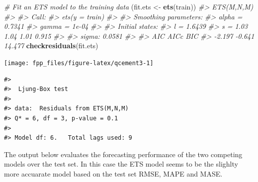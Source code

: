 \documentclass[]{book}
\newenvironment{Shaded}{\begin{snugshade}}{\end{snugshade}}
\newcommand{\CommentTok}[1]{\textcolor[rgb]{0.56,0.35,0.01}{\textit{#1}}}
\newcommand{\DataTypeTok}[1]{\textcolor[rgb]{0.13,0.29,0.53}{#1}}
\newcommand{\DecValTok}[1]{\textcolor[rgb]{0.00,0.00,0.81}{#1}}
\newcommand{\KeywordTok}[1]{\textcolor[rgb]{0.13,0.29,0.53}{\textbf{#1}}}
\newcommand{\NormalTok}[1]{#1}
\newcommand{\OperatorTok}[1]{\textcolor[rgb]{0.81,0.36,0.00}{\textbf{#1}}}
\newcommand{\StringTok}[1]{\textcolor[rgb]{0.31,0.60,0.02}{#1}}
\begin{document}
\begin{Shaded}
\begin{Highlighting}[]
\CommentTok{# Fit an ETS model to the training data}
\NormalTok{(fit.ets <-}\StringTok{ }\KeywordTok{ets}\NormalTok{(train))}
\CommentTok{#> ETS(M,N,M) }
\CommentTok{#> }
\CommentTok{#> Call:}
\CommentTok{#>  ets(y = train) }
\CommentTok{#> }
\CommentTok{#>   Smoothing parameters:}
\CommentTok{#>     alpha = 0.7341 }
\CommentTok{#>     gamma = 1e-04 }
\CommentTok{#> }
\CommentTok{#>   Initial states:}
\CommentTok{#>     l = 1.6439 }
\CommentTok{#>     s = 1.03 1.04 1.01 0.915}
\CommentTok{#> }
\CommentTok{#>   sigma:  0.0581}
\CommentTok{#> }
\CommentTok{#>    AIC   AICc    BIC }
\CommentTok{#> -2.197 -0.641 14.477}
\KeywordTok{checkresiduals}\NormalTok{(fit.ets)}
\end{Highlighting}
\end{Shaded}

\begin{center}\texttt{[image: fpp\_files/figure-latex/qcement3-1]} \end{center}

\begin{verbatim}
#> 
#>  Ljung-Box test
#> 
#> data:  Residuals from ETS(M,N,M)
#> Q* = 6, df = 3, p-value = 0.1
#> 
#> Model df: 6.   Total lags used: 9
\end{verbatim}

The output below evaluates the forecasting performance of the two competing models over the test set. In this case the ETS model seems to be the slighlty more accuarate model based on the test set RMSE, MAPE and MASE.

\begin{Shaded}
\end{Shaded}
\end{document}
